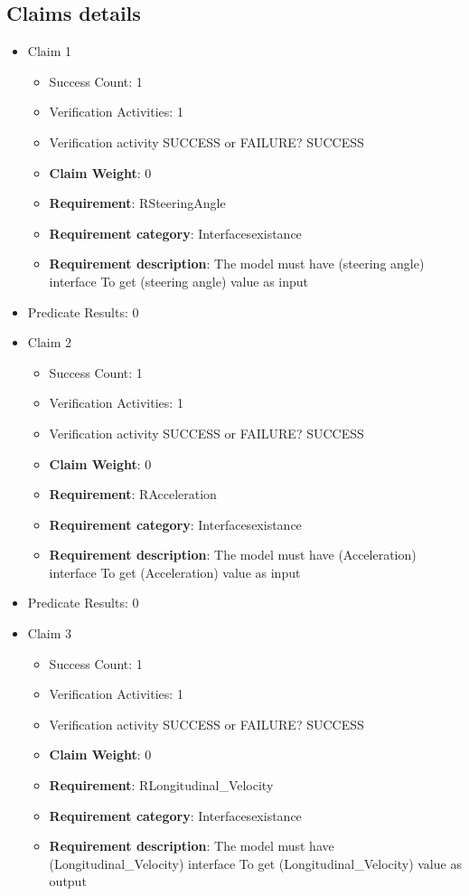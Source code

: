 \documentclass{article}
\begin{document}
			\subsection{Claims details}
			\begin{itemize}
  				  \item Claim 1
				\begin{itemize}
			    	\item Success Count: 1 
			    	\item Verification Activities: 1
					\item Verification activity SUCCESS or FAILURE? SUCCESS
					\item \textbf{Claim Weight}: 0
						\item \textbf{Requirement}: RSteeringAngle 
						\item \textbf{Requirement category}: Interfacesexistance 
						\item \textbf{Requirement description}: The model must have (steering angle) interface To get (steering angle) value as input
					
				\end{itemize}
				
									    
				\item Predicate Results: 0

  				  \item Claim 2
				\begin{itemize}
			    	\item Success Count: 1 
			    	\item Verification Activities: 1
					\item Verification activity SUCCESS or FAILURE? SUCCESS
					\item \textbf{Claim Weight}: 0
						\item \textbf{Requirement}: RAcceleration 
						\item \textbf{Requirement category}: Interfacesexistance 
						\item \textbf{Requirement description}: The model must have (Acceleration) interface To get (Acceleration) value as input
					
				\end{itemize}
				
									    
				\item Predicate Results: 0

  				  \item Claim 3
				\begin{itemize}
			    	\item Success Count: 1 
			    	\item Verification Activities: 1
					\item Verification activity SUCCESS or FAILURE? SUCCESS
					\item \textbf{Claim Weight}: 0
						\item \textbf{Requirement}: RLongitudinal_Velocity 
						\item \textbf{Requirement category}: Interfacesexistance 
						\item \textbf{Requirement description}: The model must have (Longitudinal_Velocity) interface To get (Longitudinal_Velocity) value as output
					

\end{itemize}
\end{itemize}
\end{document}
